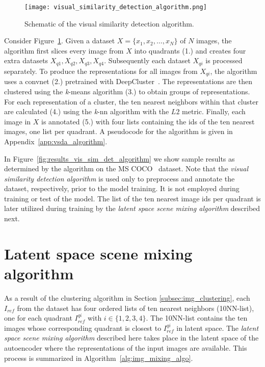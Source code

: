 \documentclass[a4paper,12pt]{report}
\begin{document}
\begin{figure}[ht]
\centering
\texttt{[image: visual\_similarity\_detection\_algorithm.png]}
\caption{Schematic of the visual similarity detection algorithm.}
\label{fig:schematic_vsda}
\end{figure}
Consider Figure~\ref{fig:schematic_vsda}. Given a dataset $X = \{x_1,x_2,\dots,x_N\}$ of $N$ images, the algorithm first slices every image from $X$ into quadrants (1.) and creates four extra datasets $X_{q1}, X_{q2}, X_{q3}, X_{q4}$. Subsequently each dataset $X_{qi}$ is processed separately. To produce the representations for all images from $X_{qi}$, the algorithm uses a convnet (2.) pretrained with DeepCluster~\cite{DeepCluster}. The representations are then clustered using the \textit{k}-means algorithm (3.) to obtain groups of representations. For each representation of a cluster, the ten nearest neighbors within that cluster are calculated (4.) using the \textit{k}-nn algorithm with the $L2$ metric. Finally, each image in $X$ is annotated (5.) with four lists containing the ids of the ten nearest images, one list per quadrant. A pseudocode for the algorithm is given in Appendix~\ref{app:vsda_algorithm}.


In Figure~\ref{fig:results_vis_sim_det_algorithm} we show sample results as determined by the algorithm on the MS COCO~\cite{MsCoco} dataset. Note that the \textit{visual similarity detection algorithm} is used only to preprocess and annotate the dataset, respectively, prior to the model training. It is not employed during training or test of the model. The list of the ten nearest image ids per quadrant is later utilized during training by the \textit{latent space scene mixing algorithm} described next.

\section{Latent space scene mixing algorithm} \label{subsec:img_mixing_algo}
As a result of the clustering algorithm in Section \ref{subsec:img_clustering}, each $I_{ref}$ from the dataset has four ordered lists of ten nearest neighbors (10NN-list), one for each quadrant $I^{qi}_{ref}$ with $i \in \{1,2,3,4\}$. The 10NN-list contains the ten images whose corresponding quadrant is closest to $I^{qi}_{ref}$ in latent space. The \textit{latent space scene mixing algorithm} described here takes place in the latent space of the autoencoder where the representations of the input images are available. This process is summarized in Algorithm~\ref{alg:img_mixing_algo}. 
\end{document}
